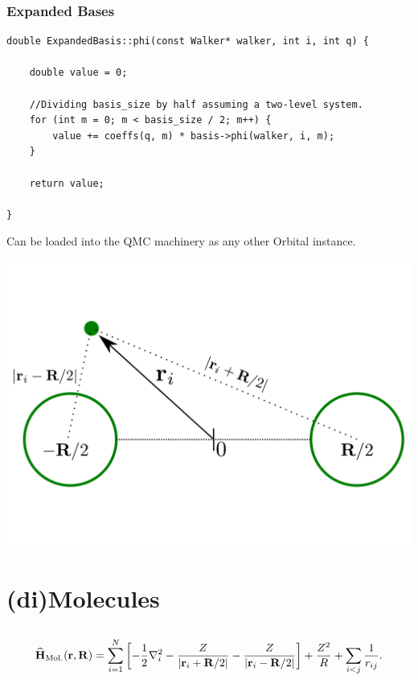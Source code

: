 \documentclass{beamer}
\newcommand{\OP}[1]{{\bf\widehat{#1}}}
\begin{document}
\begin{frame}[containsverbatim]\frametitle{Expanded Bases}
\scriptsize
\begin{verbatim}
double ExpandedBasis::phi(const Walker* walker, int i, int q) {

    double value = 0;

    //Dividing basis_size by half assuming a two-level system.
    for (int m = 0; m < basis_size / 2; m++) {
        value += coeffs(q, m) * basis->phi(walker, i, m);
    }

    return value;

}
\end{verbatim}
\normalsize

Can be loaded into the QMC machinery as any other Orbital instance.
\end{frame}




\begin{frame}
\begin{center}
 \includegraphics[scale=0.35]{Molecules.pdf}
\end{center}
\end{frame}


\section{(di)Molecules}
\subsection*{}

\begin{frame}
 \begin{equation*}
 \OP{H}_{\mathrm{Mol.}}(\mathbf{r}, \mathbf{R}) = \sum_{i=1}^N \left[-\frac{1}{2}\nabla_i^2 - \frac{Z}{|\mathbf{r}_i + \mathbf{R}/2|} - \frac{Z}{|\mathbf{r}_i - \mathbf{R}/2|}\right] + \frac{Z^2}{R} + \sum_{i<j} \frac{1}{r_{ij}}.
\end{equation*}
\end{frame}
\end{document}
